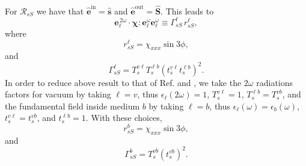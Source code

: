 \documentclass[aps,11pt]{revtex4}
\begin{document}
For $\mathcal{R}_{sS}$ we have that
$\hat{\mathbf{e}}^{\mathrm{in}}=\hat{\mathbf{s}}$ and
$\hat{\mathbf{e}}^{\mathrm{out}}=\hat{\mathbf{S}}$. This leads to
\begin{equation}
\mathbf{e}^{\,2\omega}_{\ell}\cdot
\boldsymbol{\chi}:\mathbf{e}^\omega_{\ell}\mathbf{e}^\omega_{\ell}
\equiv\Gamma^{\ell}_{sS}\, r^{\ell}_{sS},
\end{equation}
where
\begin{equation}
r^{\ell}_{sS} = \chi_{xxx}\sin3\phi,
\end{equation}
and
\begin{equation}
\Gamma^{\ell}_{sS}=
T^{v\ell}_{s}T^{\ell b}_{s}\left(t^{v\ell}_{s}t^{\ell b}_{s}\right)^{2}.
\end{equation} 
In order to reduce above result to that of Ref. \cite{mizrahiJOSA88} and
\cite{sipePRB87}, we take the $2\omega$ radiations factors for vacuum by
taking $\ell=v$, thus $\epsilon_{\ell}(2\omega)=1$, $T^{v\ell}_{s}=1$,
$T^{\ell b}_{s}=T^{vb}_{s}$, and the fundamental field inside medium $b$ by
taking $\ell=b$, thus $\epsilon_{\ell}(\omega)=\epsilon_{b}(\omega)$,
$t^{v\ell}_{s}=t^{vb}_{s}$, and $t^{\ell b}_{s}=1$. With these choices,
\begin{equation}
r^{b}_{sS} = \chi_{xxx}\sin3\phi,
\end{equation}
and 
\begin{equation}
\Gamma^{b}_{sS} = T^{vb}_{s}\left(t^{vb}_{s}\right)^{2}.
\end{equation} 


\appendix

%




\end{document}
